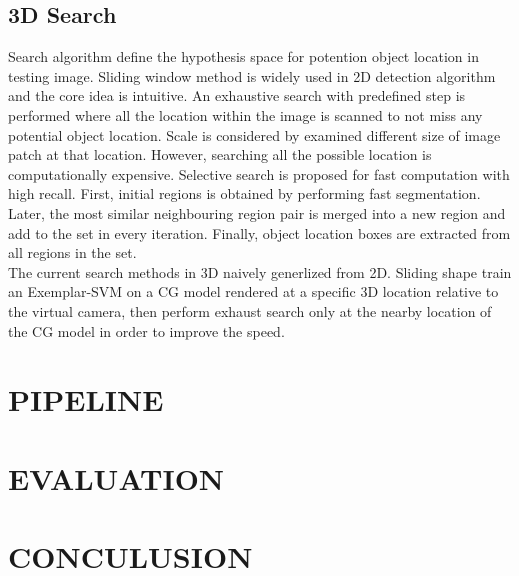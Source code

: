 \documentclass[english]{ccdconf}
\begin{document}
\subsection{3D Search}
Search algorithm define the hypothesis space for potention object location in testing image. Sliding window method is widely used in 2D detection algorithm\cite{dalal2005histograms,felzenszwalb2010object} and the core idea is intuitive.  An exhaustive search with predefined step is performed where all the location within the image is scanned to not miss any potential object location. Scale is considered by examined different size of image patch at that location. However, searching all the possible location is computationally expensive. Selective search is proposed for fast computation with high recall\cite{uijlings2013selective}. First, initial regions is obtained by performing fast segmentation\cite{felzenszwalb2004efficient}. Later, the most similar neighbouring region pair is merged into a new region and add to the set in every iteration. Finally, object location boxes are extracted from all regions in the set.\\
The current search methods in 3D naively generlized from 2D. Sliding shape train an Exemplar-SVM on a CG model rendered at a specific 3D location relative to the virtual camera, then perform exhaust search only at the nearby location of the CG model in order to improve the speed.
\section{PIPELINE}
\section{EVALUATION}
\section{CONCULUSION}
%
\end{document}
